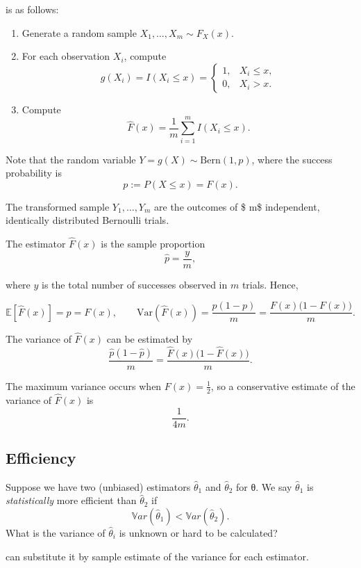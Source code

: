 \documentclass[
  letterpaper,
  DIV=11,
  numbers=noendperiod]{scrreprt}
\begin{document}
{is as follows:

\begin{enumerate}
\def\labelenumi{\arabic{enumi}.}
\item
  Generate a random sample \(X_1,\dots,X_m \sim F_X(x)\).
\item
  For each observation \(X_i\), compute \[
  g(X_i) = I(X_i \leq x) =
  \begin{cases}
  1, & X_i \leq x, \\
  0, & X_i > x.
  \end{cases}
  \]
\item
  Compute \[
  \hat{F}(x) = \frac{1}{m} \sum_{i=1}^m I(X_i \leq x).
  \]
\end{enumerate}

Note that the random variable \(Y = g(X) \sim \text{Bern}(1, p)\), where
the success probability is\\
\[
p := P(X \leq x) = F(x).
\]

The transformed sample \(Y_1, \ldots, Y_m\) are the outcomes of \$ m\$
independent, identically distributed Bernoulli trials.

The estimator \(\hat{F}(x)\) is the sample proportion \[
\hat{p} = \frac{y}{m},
\]

where \(y\) is the total number of successes observed in \(m\) trials.
Hence,

\[
\mathbb{E}[\hat{F}(x)] = p = F(x), \qquad 
\mathrm{Var}(\hat{F}(x)) = \frac{p(1-p)}{m} = \frac{F(x)\big(1-F(x)\big)}{m}.
\]

The variance of \(\hat{F}(x)\) can be estimated by \[
\frac{\hat{p}(1-\hat{p})}{m} = \frac{\hat{F}(x)\big(1-\hat{F}(x)\big)}{m}.
\]

The maximum variance occurs when \(F(x) = \tfrac{1}{2}\), so a
conservative estimate of the variance of \(\hat{F}(x)\) is \[
\frac{1}{4m}.
\]

\subsection{Efficiency}\label{efficiency}

Suppose we have two (unbiased) estimators \(\hat{\theta}_1\) and
\(\hat{\theta}_2\) for θ. We say \(\hat{\theta}_1\) is
\emph{statistically} more efficient than \(\hat{\theta}_2\) if
\[\mathbb{V}ar(\hat{\theta}_1) < \mathbb{V}ar(\hat{\theta}_2).\] What is
the variance of \(\hat{\theta}_i\) is unknown or hard to be calculated?

can substitute it by sample estimate of the variance for each estimator.

}
\end{document}
